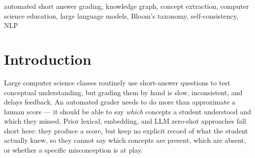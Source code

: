 \documentclass[conference]{IEEEtran}
\begin{document}
\begin{IEEEkeywords}
automated short answer grading, knowledge graph, concept extraction,
computer science education, large language models, Bloom's taxonomy,
self-consistency, NLP
\end{IEEEkeywords}

\section{Introduction}

Large computer science classes routinely use short-answer questions to
test conceptual understanding, but grading them by hand is slow,
inconsistent, and delays feedback. An automated grader needs to do more
than approximate a human score — it should be able to say \emph{which}
concepts a student understood and which they missed. Prior lexical,
embedding, and LLM zero-shot approaches fall short here: they produce a
score, but keep no explicit record of what the student actually knew, so
they cannot say which concepts are present, which are absent, or
whether a specific misconception is at play.
\end{document}
